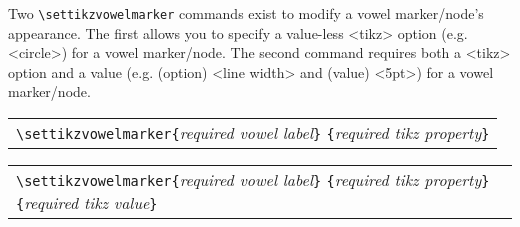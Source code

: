 \documentclass{article}
\newcommand{\pkg}[1]{\texttt{#1}}
\def\\{}%
\def\texttt#1{<#1>}%
\begin{document}
\bigskip
\noindent
Two \verb|\settikzvowelmarker| commands exist to modify a vowel marker/node's appearance.  The first allows you to specify a value-less \pkg{tikz} option (e.g. \texttt{circle}) for a vowel marker/node.  The second command requires both a \pkg{tikz} option and a value (e.g. (option) \texttt{line width} and (value) \texttt{5pt}) for a vowel marker/node.
\begin{center}
	\begin{tabular}{l}
		\begin{minipage}[t]{0.85\textwidth}
			{\small
				\verb|\settikzvowelmarker{|\textit{required vowel label}\verb|}|\\
				\hspace*{10.5em}\verb|{|\textit{required tikz property}\verb|}|
			}
		\end{minipage} \\
	\end{tabular}
\end{center}
\begin{center}
	\begin{tabular}{l}
		\begin{minipage}[t]{0.85\textwidth}
			{\small
				\verb|\settikzvowelmarker{|\textit{required vowel label}\verb|}|\\
				\hspace*{10.5em}\verb|{|\textit{required tikz property}\verb|}|\\
				\hspace*{10.5em}\verb|{|\textit{required tikz value}\verb|}|
			}
		\end{minipage} \\
	\end{tabular}
\end{center}
\end{document}
